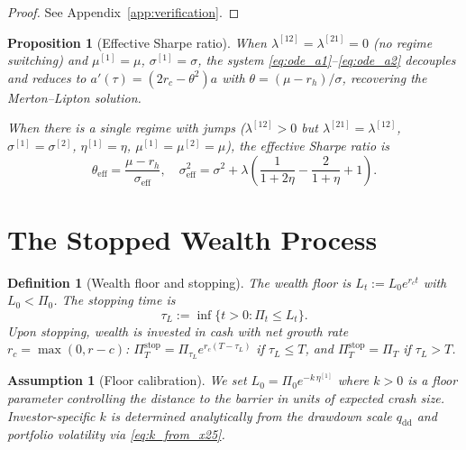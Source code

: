 \documentclass[11pt,a4paper]{article}
\numberwithin{equation}{section}
\newtheorem{proposition}[theorem]{Proposition}
\newtheorem{definition}[theorem]{Definition}
\newtheorem{assumption}[theorem]{Assumption}
\begin{document}
\begin{proof}
See Appendix~\ref{app:verification}.
\end{proof}


\begin{proposition}[Effective Sharpe ratio]\label{prop:single_regime}
When $\lambda^{[12]} = \lambda^{[21]} = 0$ (no regime switching) and $\mu^{[1]} = \mu$, $\sigma^{[1]} = \sigma$, the system \eqref{eq:ode_a1}--\eqref{eq:ode_a2} decouples and reduces to $a'(\tau) = (2r_c - \theta^2) a$ with $\theta = (\mu - r_h)/\sigma$, recovering the Merton--Lipton solution.

When there is a single regime with jumps ($\lambda^{[12]} > 0$ but $\lambda^{[21]} = \lambda^{[12]}$, $\sigma^{[1]} = \sigma^{[2]}$, $\eta^{[1]} = \eta$, $\mu^{[1]} = \mu^{[2]} = \mu$), the effective Sharpe ratio is
\begin{equation}\label{eq:theta_eff}
\theta_{\mathrm{eff}} = \frac{\mu - r_h}{\sigma_{\mathrm{eff}}}, \quad \sigma_{\mathrm{eff}}^2 = \sigma^2 + \lambda \left(\frac{1}{1+2\eta} - \frac{2}{1+\eta} + 1\right).
\end{equation}
\end{proposition}




\section{The Stopped Wealth Process}\label{sec:stopped}


\begin{definition}[Wealth floor and stopping]\label{def:floor}
The wealth floor is $L_t := L_0 e^{r_c t}$ with $L_0 < \Pi_0$. The stopping time is
\begin{equation}\label{eq:tau_L}
\tau_L := \inf\{t > 0 : \Pi_t \leq L_t\}.
\end{equation}
Upon stopping, wealth is invested in cash with net growth rate $r_c=\max(0, r-c)$: $\Pi^{\mathrm{stop}}_T = \Pi_{\tau_L} e^{r_c(T-\tau_L)}$ if $\tau_L \leq T$, and $\Pi^{\mathrm{stop}}_T = \Pi_T$ if $\tau_L > T$.
\end{definition}

\begin{assumption}[Floor calibration]\label{ass:floor}
We set $L_0 = \Pi_0 e^{-k\,\eta^{[1]}}$ where $k > 0$ is a floor parameter controlling the distance to the barrier in units of expected crash size.  Investor-specific $k$ is determined analytically from the drawdown scale $q_{\mathrm{dd}}$ and portfolio volatility via \eqref{eq:k_from_x25}.
\end{assumption}
\end{document}
